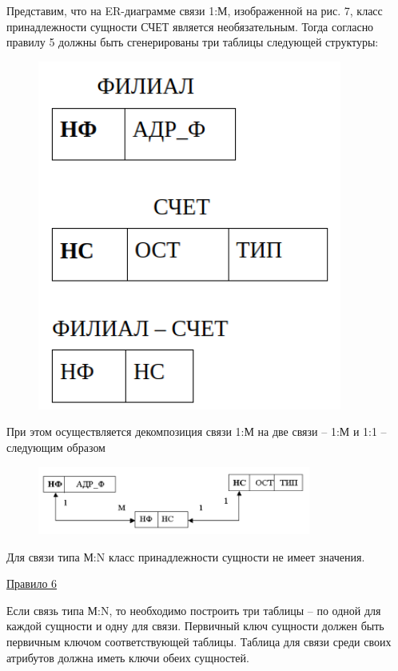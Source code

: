 \begin{enumerate}
    Представим, что на ER-диаграмме связи 1:М, изображенной на рис. 7, класс принадлежности сущности СЧЕТ
    является необязательным. Тогда согласно правилу 5 должны быть сгенерированы три таблицы следующей структуры:

    \begin{figure}[H]
        \centering
        \includegraphics[width=100mm]{assets/security/pic11.png}
        \label{fig:mesh13}
    \end{figure}

    При этом осуществляется декомпозиция связи 1:М на две связи – 1:М и 1:1 – следующим образом

    \begin{figure}[H]
        \centering
        \includegraphics[width=0.8\textwidth]{assets/security/pic12.png}
        \label{fig:mesh14}
    \end{figure}

    Для связи типа М:N класс принадлежности сущности не имеет значения.

    \underline{Правило 6}

    Если связь типа М:N, то необходимо построить три таблицы – по одной для каждой сущности и одну для связи.
    Первичный ключ сущности должен быть первичным ключом соответствующей таблицы. Таблица для связи среди своих
    атрибутов должна иметь ключи обеих сущностей.


\end{enumerate}
